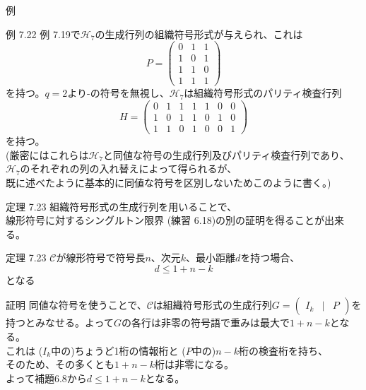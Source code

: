 \documentclass[dvipdfmx,10pt,jsarticle]{beamer}
\begin{document}
  \begin{frame}{例}
    \begin{block}{例 7.22}
      例 7.19で$\mathcal{H}_7$の生成行列の組織符号形式が与えられ、これは
      \[ P = \begin{pmatrix}
          0 & 1 & 1 \\
          1 & 0 & 1 \\
          1 & 1 & 0 \\
          1 & 1 & 1
      \end{pmatrix} \]
      を持つ。$q=2$より-の符号を無視し、$\mathcal{H}_7$は組織符号形式のパリティ検査行列
      \[ H = \begin{pmatrix}
          0 & 1 & 1 & 1 & 1 & 0 & 0 \\
          1 & 0 & 1 & 1 & 0 & 1 & 0 \\
          1 & 1 & 0 & 1 & 0 & 0 & 1 
      \end{pmatrix} \]
      を持つ。\\
      (厳密にはこれらは$\mathcal{H}_7$と同値な符号の生成行列及びパリティ検査行列であり、$\mathcal{H}_7$のそれぞれの列の入れ替えによって得られるが、 \\
      既に述べたように基本的に同値な符号を区別しないためこのように書く。)
    \end{block}
  \end{frame}
  \begin{frame}{定理 7.23}
    組織符号形式の生成行列を用いることで、 \\
    線形符号に対するシングルトン限界 (練習 6.18)の別の証明を得ることが出来る。
    \begin{block}{定理 7.23}
      $\mathcal{C}$が線形符号で符号長$n$、次元$k$、最小距離$d$を持つ場合、
      \[ d \leq 1 + n - k \]
      となる
    \end{block}
    \begin{block}{証明}
    同値な符号を使うことで、$\mathcal{C}$は組織符号形式の生成行列$G = \begin{pmatrix}
      I_k & \mid & P
  \end{pmatrix}$を持つとみなせる。よって$G$の各行は非零の符号語で重みは最大で$1 + n - k$となる。 \\
  これは ($I_k$中の)ちょうど1桁の情報桁と ($P$中の)$n-k$桁の検査桁を持ち、 \\
  そのため、その多くとも$1 + n - k$桁は非零になる。\\ 
  よって補題6.8から$d \leq 1 + n - k$となる。
    \end{block}
  \end{frame}
\end{document}
